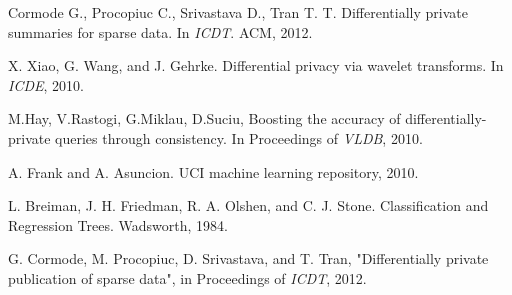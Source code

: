 \begin{thebibliography}{1}
Cormode G., Procopiuc C., Srivastava D., Tran T. T. Differentially private summaries for sparse data. In {\it ICDT}. ACM, 2012.


 X. Xiao, G. Wang, and J. Gehrke. Differential privacy via wavelet transforms. In {\it ICDE}, 2010.

 M.Hay, V.Rastogi, G.Miklau, D.Suciu, Boosting the accuracy of differentially-private queries through consistency. In Proceedings of {\it VLDB},  2010.

A. Frank and A. Asuncion. UCI machine learning repository, 2010.



 L. Breiman, J. H. Friedman, R. A. Olshen, and C. J. Stone. Classification and Regression Trees. Wadsworth, 1984.

G. Cormode, M. Procopiuc, D. Srivastava, and T. Tran, "Differentially
private publication of sparse data", in Proceedings of {\it ICDT}, 2012.

\end{thebibliography}